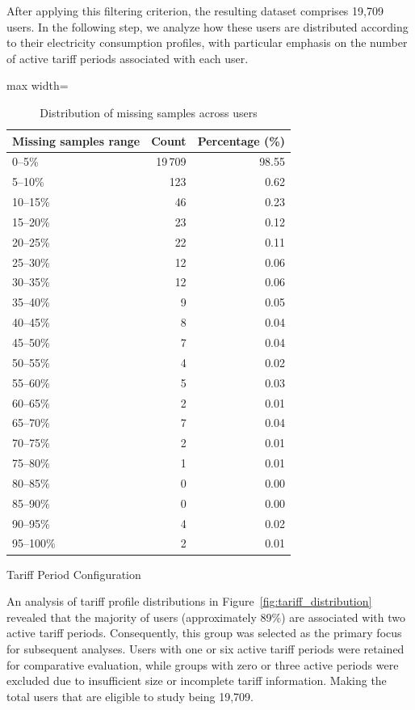 ﻿\documentclass[12pt,reqno, twoside]{amsbook}
\makeatletter
\numberwithin{figure}{chapter}
\numberwithin{table}{chapter}
\numberwithin{equation}{chapter}
\def\subsection{\@startsection{subsection}{2}%
      \z@{.5\linespacing\@plus.7\linespacing}{.25\linespacing}%
      {\normalfont\bfseries\flushleft}}
\theoremstyle{plain}
\numberwithin{equation}{chapter}
\numberwithin{section}{chapter}
\makeatother
\begin{document}
After applying this filtering criterion, the resulting dataset comprises 19,709 users. In the following step, we analyze how these users are distributed according to their electricity consumption profiles, with particular emphasis on the number of active tariff periods associated with each user.
\begin{table}[h]
\centering
\caption{Distribution of missing samples across users}
\label{tab:missing_distribution}
\begin{adjustbox}{max width=\textwidth}
\begin{tabular}{lrr}
\hline
\textbf{Missing samples range} & \textbf{Count} & \textbf{Percentage (\%)} \\
\hline
0--5\%   & 19\,709 & 98.55 \\
5--10\%  &    123  &  0.62 \\
10--15\% &     46  &  0.23 \\
15--20\% &     23  &  0.12 \\
20--25\% &     22  &  0.11 \\
25--30\% &     12  &  0.06 \\
30--35\% &     12  &  0.06 \\
35--40\% &      9  &  0.05 \\
40--45\% &      8  &  0.04 \\
45--50\% &      7  &  0.04 \\
50--55\% &      4  &  0.02 \\
55--60\% &      5  &  0.03 \\
60--65\% &      2  &  0.01 \\
65--70\% &      7  &  0.04 \\
70--75\% &      2  &  0.01 \\
75--80\% &      1  &  0.01 \\
80--85\% &      0  &  0.00 \\
85--90\% &      0  &  0.00 \\
90--95\% &      4  &  0.02 \\
95--100\%&      2  &  0.01 \\
\hline
\end{tabular}
\end{adjustbox}
\end{table}
\FloatBarrier

\subsection{Tariff Period Configuration}

\noindent
An analysis of tariff profile distributions in Figure~\ref{fig:tariff_distribution} revealed that the majority of users (approximately 89\%) are associated with two active tariff periods. Consequently, this group was selected as the primary focus for subsequent analyses. Users with one or six active tariff periods were retained for comparative evaluation, while groups with zero or three active periods were excluded due to insufficient size or incomplete tariff information. Making the total users that are eligible to study being 19,709.
\end{document}
